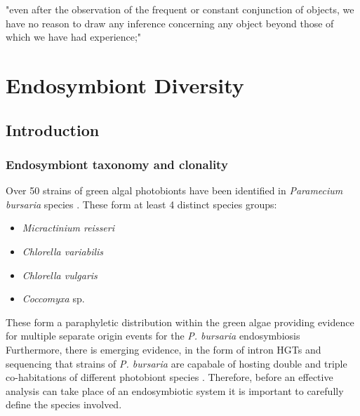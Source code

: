 % 
\graphicspath{{chapters/3.Chapter_1/figures}}


\begin{savequote}[75mm]
"even after the observation of the frequent or constant conjunction of objects, we have no reason to draw any inference concerning any object beyond those of which we have had experience;"
\end{savequote}

\chapter{Endosymbiont Diversity}\label{chap:endo_diversity}

\section{Introduction}

\subsection{Endosymbiont taxonomy and clonality}

Over 50 strains of green algal photobionts have been identified in 
\textit{Paramecium bursaria} species \citep{Hoshina2010,Hoshina2004,Hoshina2009,Summerer2008,Vorobyev2009}. 
These form at least 4 distinct species groups:
\begin{itemize}
    \item \textit{Micractinium reisseri} 
    \item \textit{Chlorella variabilis}
    \item \textit{Chlorella vulgaris}
    \item \textit{Coccomyxa} sp. 
\end{itemize}
These form a paraphyletic distribution within the green algae
providing evidence for multiple separate origin events for
the \textit{P. bursaria} endosymbiosis \citep{Hoshina2008,Hoshina2009}
Furthermore, there is emerging evidence, in the form
of intron HGTs and sequencing that strains of \textit{P. bursaria}
are capabale of hosting double and triple co-habitations of different
photobiont species \citep{Hoshina2012}. Therefore,
before an effective analysis can take place of
an endosymbiotic system it is important
to carefully define the species involved. 


